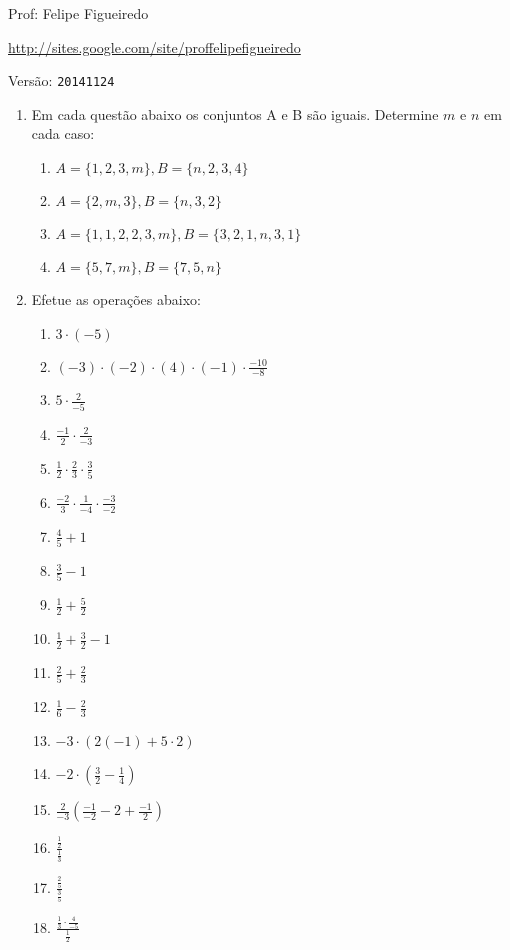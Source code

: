 \documentclass[a4paper]{article}
\begin{document}
\parbox[c]{.825\textwidth}{\raggedright%
{Prof: Felipe Figueiredo\par}
{\url{http://sites.google.com/site/proffelipefigueiredo}}
}

Versão: \verb|20141124|



\begin{enumerate}
\section{Exercícios}

\item Em cada questão abaixo os conjuntos A e B são iguais. Determine
  $m$ e $n$ em cada caso:
  \begin{enumerate}
  \item $A = \{1,2,3,m\}, B = \{n,2,3,4\}$
  \item $A = \{2,m,3\}, B = \{n,3,2\}$
  \item $A = \{1,1,2,2,3,m\}, B = \{3,2,1,n,3,1\}$
  \item $A = \{5,7,m\}, B = \{7,5,n\}$
  \end{enumerate}

\item Efetue as operações abaixo:
  \begin{enumerate}
  \item $3 \cdot (-5)$
  \item $(-3)\cdot(-2)\cdot(4)\cdot(-1)\cdot\frac{-10}{-8}$
  \item $5 \cdot \frac{2}{-5}$
  \item $\frac{-1}{2}\cdot\frac{2}{-3}$
  \item $\frac{1}{2}\cdot\frac{2}{3}\cdot\frac{3}{5}$
  \item $\frac{-2}{3}\cdot\frac{1}{-4}\cdot\frac{-3}{-2}$
  \item $\frac{4}{5} + 1$
  \item $\frac{3}{5} - 1$
  \item $\frac{1}{2} + \frac{5}{2}$
  \item $\frac{1}{2} + \frac{3}{2} - 1$
  \item $\frac{2}{5} + \frac{2}{3}$
  \item $\frac{1}{6} - \frac{2}{3}$
  \item $-3\cdot\left( 2 (-1) + 5 \cdot 2  \right)$
  \item $-2 \cdot \left( \frac{3}{2} - \frac{1}{4} \right)$
  \item $\frac{2}{-3}\left( \frac{-1}{-2} - 2 + \frac{-1}{2}  \right)$
  \item $\frac{\frac{1}{2}}{\frac{1}{3}}$
  \item $\frac{\frac{2}{5}}{\frac{3}{5}}$
  \item $\frac{\frac{1}{3} \cdot \frac{4}{-5}}{\frac{1}{2}}$
  \end{enumerate}


\end{enumerate}
\end{document}
